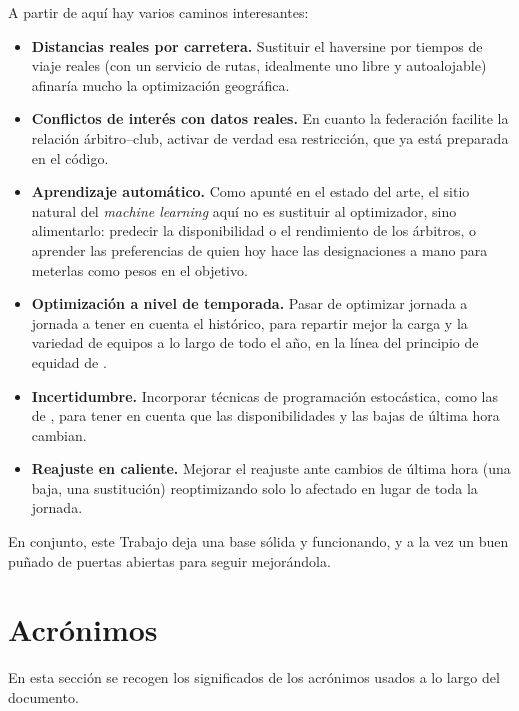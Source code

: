 \documentclass[11pt,a4paper,spanish]{book}
\numberwithin{equation}{chapter}
\numberwithin{figure}{chapter}
\numberwithin{table}{chapter}
\begin{document}
A partir de aquí hay varios caminos interesantes:

\begin{itemize}
\item {\bf Distancias reales por carretera.} Sustituir el haversine por tiempos de viaje reales (con un servicio de rutas, idealmente uno libre y autoalojable) afinaría mucho la optimización geográfica.
\item {\bf Conflictos de interés con datos reales.} En cuanto la federación facilite la relación árbitro--club, activar de verdad esa restricción, que ya está preparada en el código.
\item {\bf Aprendizaje automático.} Como apunté en el estado del arte, el sitio natural del \emph{machine learning} aquí no es sustituir al optimizador, sino alimentarlo: predecir la disponibilidad o el rendimiento de los árbitros, o aprender las preferencias de quien hoy hace las designaciones a mano para meterlas como pesos en el objetivo.
\item {\bf Optimización a nivel de temporada.} Pasar de optimizar jornada a jornada a tener en cuenta el histórico, para repartir mejor la carga y la variedad de equipos a lo largo de todo el año, en la línea del principio de equidad de .
\item {\bf Incertidumbre.} Incorporar técnicas de programación estocástica, como las de , para tener en cuenta que las disponibilidades y las bajas de última hora cambian.
\item {\bf Reajuste en caliente.} Mejorar el reajuste ante cambios de última hora (una baja, una sustitución) reoptimizando solo lo afectado en lugar de toda la jornada.
\end{itemize}

En conjunto, este Trabajo deja una base sólida y funcionando, y a la vez un buen puñado de puertas abiertas para seguir mejorándola.




\appendix
\chapter{Acrónimos}

En esta sección se recogen los significados de los acrónimos usados a lo largo del documento.
\end{document}
